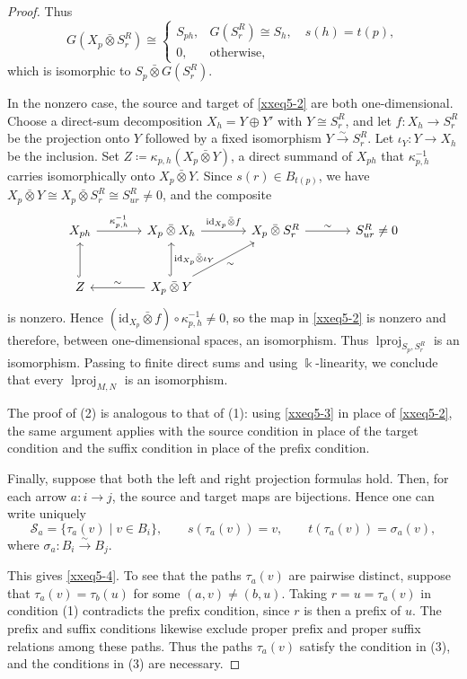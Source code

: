 \documentclass{amsart}
\newcommand{\id}{\mathrm{id}}
\DeclareMathOperator{\lproj}{lproj}
\newcommand{\btensor}{\mathbin{\bar{\otimes}}}
\theoremstyle{definition}
\theoremstyle{remark}
\numberwithin{equation}{section}
\begin{document}
\begin{proof}
Thus
\[
G(X_p\btensor S_r^R)
\cong
\begin{cases}
S_{ph},
&
G(S_r^R)\cong S_h,
\quad
s(h)=t(p),
\\
0,
&
\text{otherwise},
\end{cases}
\]
which is isomorphic to $S_p\btensor G(S_r^R)$.

In the nonzero case, the source and target of
\eqref{xxeq5-2}
are both one-dimensional.
Choose a direct-sum decomposition $X_h=Y\oplus Y'$ with
$Y\cong S_r^R$, and let $f\colon X_h\to S_r^R$ be the projection
onto $Y$ followed by a fixed isomorphism
$Y\xrightarrow{\sim}S_r^R$. Let $\iota_Y\colon Y\to X_h$ be the
inclusion. Set $Z\coloneqq\kappa_{p,h}(X_p\btensor Y)$, a direct summand of
$X_{ph}$ that $\kappa_{p,h}^{-1}$ carries isomorphically onto
$X_p\btensor Y$.
Since $s(r)\in B_{t(p)}$, we have
$X_p\btensor Y\cong X_p\btensor S_r^R\cong S_{ur}^R\neq0$, and the
composite
\[
\begin{tikzcd}[column sep=large,row sep=large]
X_{ph}
  \arrow[r,"\kappa_{p,h}^{-1}"]
&
X_p\btensor X_h
  \arrow[r,"\id_{X_p}\btensor f"]
&
X_p\btensor S_r^R
  \arrow[r,"\sim"]
&
S_{ur}^R\neq0\\
Z
  \arrow[u,hook]
&
X_p\btensor Y
  \arrow[l,"\sim"']
  \arrow[u,hook,"\id_{X_p}\btensor\iota_Y"']
  \arrow[ur,"\sim"']
&
&
\end{tikzcd}
\]
is nonzero. Hence $(\id_{X_p}\btensor f)\circ\kappa_{p,h}^{-1}\neq0$, so the map in
\eqref{xxeq5-2} is nonzero and therefore, between
one-dimensional spaces, an isomorphism.
Thus $\lproj_{S_p,S_r^R}$ is an isomorphism.
Passing to finite direct sums and using $\Bbbk$-linearity, we conclude that every
$\lproj_{M,N}$
is an isomorphism.

The proof of \textup{(2)} is analogous to that of \textup{(1)}:
using \eqref{xxeq5-3} in place of
\eqref{xxeq5-2}, the same argument applies with the
source condition in place of the target condition and the suffix condition
in place of the prefix condition.

Finally, suppose that both the left and right projection formulas hold.
Then, for each arrow $a\colon i\to j$, the source and target maps are bijections.
Hence one can write uniquely
\[
\mathcal S_a
=\{\tau_a(v)\mid v\in B_i\},
\qquad
s(\tau_a(v))=v,
\qquad
t(\tau_a(v))=\sigma_a(v),
\]
where $\sigma_a\colon B_i\xrightarrow{\sim}B_j$.

This gives
\eqref{xxeq5-4}.
To see that the paths $\tau_a(v)$ are pairwise distinct, suppose that
$\tau_a(v)=\tau_b(u)$ for some $(a,v)\neq(b,u)$. Taking
$r=u=\tau_a(v)$ in condition \textup{(1)} contradicts the prefix
condition, since $r$ is then a prefix of $u$. The prefix and suffix
conditions likewise exclude proper prefix and proper suffix relations
among these paths. Thus the paths $\tau_a(v)$ satisfy the condition in
\textup{(3)}, and the conditions in \textup{(3)} are necessary.


\end{proof}
\end{document}
